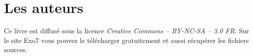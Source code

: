 
\clearemptydoublepage
\pagestyle{empty}\thispagestyle{empty}

\vspace*{\fill}

\section*{Les auteurs}


\medskip



Ce livre est diffusé sous la licence \emph{Creative Commons -- BY-NC-SA -- 3.0 FR}.
Sur le site Exo7 vous pouvez le télécharger gratuitement et 
aussi récupérer les fichiers sources.
\vspace*{\fill}



\printindex
{}

